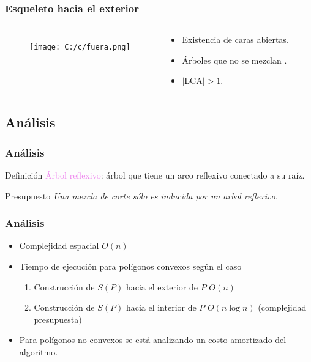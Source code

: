 \documentclass[notes=show]{beamer}
\begin{document}
\begin{frame}
\frametitle{Esqueleto hacia el exterior}

\begin{columns}[6cm]

\column{6cm}
\begin{figure}
	\centering
		\texttt{[image: C:/c/fuera.png]}%

\end{figure}


\column{5cm}

\begin{block}{}
\begin{itemize}
	\item<1-| alert@+>Existencia de caras abiertas.
	\item<2-| alert@+>\'Arboles que no se mezclan .
	\item<3-| alert@+>$|$LCA$|>1$.
\end{itemize}\end{block}
\end{columns}
\transboxin[duration=0.4]
\end{frame}

\subsection{An\'alisis}


\begin{frame}
\frametitle{An\'alisis}
\begin{block}{Definici\'on}
\textcolor{violet}{\'Arbol reflexivo}: \'arbol que tiene un arco reflexivo conectado a su ra\'iz.
\end{block}
\pause
\begin{block}{Presupuesto}
\emph{Una mezcla de corte s\'olo es inducida por un arbol reflexivo. }
\end{block}
\transboxout[duration=0.4]
\end{frame}

\begin{frame}
\frametitle{An\'alisis}
\begin{itemize}
	\item<1-| alert@1>Complejidad espacial $O(n)$
	\item<2->Tiempo de ejecuci\'on para pol\'igonos convexos seg\'un el caso 
	\begin{enumerate}
	\item<3-| alert@3> Construcci\'on de $S(P)$ hacia el exterior de $P$ $O(n)$
	\item<4-| alert@4> Construcci\'on de $S(P)$ hacia el interior de $P$ $O(n\log n)$ (complejidad presupuesta)
	\end{enumerate}
	\item<5-| alert@5>Para pol\'igonos no convexos se est\'a analizando un costo amortizado	del algoritmo. 
\end{itemize}
\transboxout[duration=0.4]
\end{frame}
\end{document}
